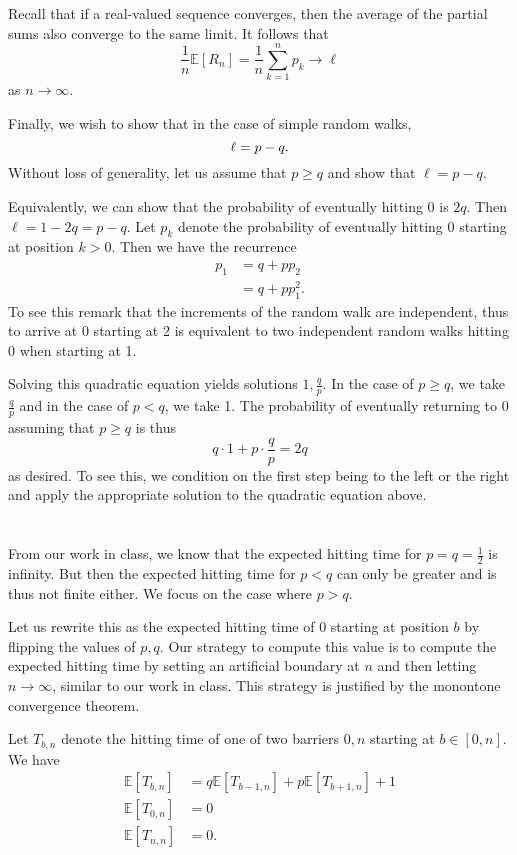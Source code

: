 \documentclass[10pt]{article}
\let\abs\relax
\DeclarePairedDelimiter{\abs}{\lvert}{\rvert}
\newcommand{\E}{\mathbb{E}}
\begin{document}
Recall that if a real-valued sequence converges,
then the average of the partial sums also converge to the same limit.
It follows that
\[
  \frac1n \E[R_n]
  = \frac1n \sum_{k=1}^n p_k
  \to \ell
\]
as $n\to \infty$.

Finally,
we wish to show that in the case of simple random walks,
\[
  \ell = \abs{p-q}.
\]
Without loss of generality,
let us assume that $p\geq q$
and show that $\ell = p-q$.

Equivalently,
we can show that the probability of eventually hitting 0 is $2q$.
Then $\ell = 1-2q = p-q$.
Let $p_k$ denote the probability of eventually hitting 0
starting at position $k > 0$.
Then we have the recurrence
\begin{align*}
  p_1
  &= q + p p_2 \\
  &= q + p p_1^2.
\end{align*}
To see this remark that the increments of the random walk are independent,
thus to arrive at 0 starting at 2
is equivalent to two independent random walks hitting 0 when starting at 1.

Solving this quadratic equation yields solutions $1, \frac qp$.
In the case of $p\geq q$,
we take $\frac qp$
and in the case of $p < q$,
we take 1.
The probability of eventually returning to 0
assuming that $p\geq q$ is thus
\[
  q\cdot 1 + p\cdot \frac qp = 2q
\]
as desired.
To see this,
we condition on the first step being to the left or the right
and apply the appropriate solution to the quadratic equation above.

\clearpage
\section{}
From our work in class,
we know that the expected hitting time for $p=q=\frac12$ is infinity.
But then the expected hitting time for $p<q$ can only be greater
and is thus not finite either.
We focus on the case where $p>q$.

Let us rewrite this as the expected hitting time of 0 starting at position $b$
by flipping the values of $p, q$.
Our strategy to compute this value is to compute the expected hitting time by setting an artificial boundary at $n$
and then letting $n\to \infty$,
similar to our work in class.
This strategy is justified by the monontone convergence theorem.

Let $T_{b, n}$ denote the hitting time of one of two barriers $0, n$
starting at $b\in [0, n]$.
We have
\begin{align*}
  \E[T_{b, n}]
  &= q\E[T_{b-1, n}] + p\E[T_{b+1, n}] + 1 \\
  \E[T_{0, n}] &= 0 \\
  \E[T_{n, n}] &= 0.
\end{align*}
\end{document}
